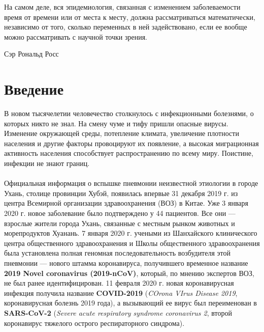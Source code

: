 \documentclass{article}
\begin{document}
\newpage

\epigraph{На самом деле, вся эпидемиология, связанная с изменением заболеваемости время от времени или от места к месту, должна рассматриваться математически, независимо от того, сколько переменных в ней задействовано, если ее вообще можно рассматривать с научной точки зрения.}{Сэр Рональд Росс}

\section*{Введение}
\noindent В новом тысячелетии человечество столкнулось с инфекционными болезнями, о которых никто не знал. На смену чуме и тифу пришли опасные вирусы. Изменение окружающей среды, потепление климата, увеличение плотности населения и другие факторы провоцируют их появление, а высокая миграционная активность населения способствует распространению по всему миру. Поистине, инфекции не знают границ.\\\\
\noindent Официальная информация о вспышке пневмонии неизвестной этиологии в городе Ухань, столице провинции Хубэй, появилась впервые 31 декабря 2019 г. из центра Всемирной организации здравоохранения (ВОЗ) в Китае. Уже 3 января 2020 г. новое заболевание было подтверждено у 44 пациентов. Все они — взрослые жители города Ухань, связанные с местным рынком животных и морепродуктов Хуанань. 7 января 2020 г. учеными из Шанхайского клинического центра общественного здравоохранения и Школы общественного здравоохранения была установлена полная геномная последовательность возбудителя этой пневмонии — нового штамма коронавируса, получившего временное
название \textbf{2019 Novel coronavirus (2019-nCoV)}, который, по мнению экспертов ВОЗ, не был ранее
идентифицирован. 11 февраля 2020 г. новая коронавирусная инфекция получила название \textbf{COVID-2019} (\textit{COrona VIrus Disease 2019}, коронавирусная болезнь 2019 года), а вызывающий ее вирус был переименован в \textbf{SARS-CoV-2} (\textit{Severe acute respiratory syndrome coronavirus 2}, второй коронавирус тяжелого острого респираторного синдрома).

\end{document}
